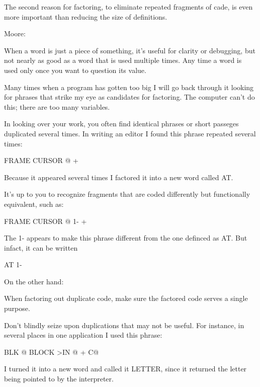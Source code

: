 \begin{tip}
The second reason for factoring, to eliminate repeated fragments of cade, is even more important than reducing the size of definitions.
\end{tip}

\begin{interview}
Moore:

\begin{tfquot}
When a word is just a piece of something, it's useful for clarity or debugging, but not nearly as good as a word that is used multiple times. Any time a word is used only once you want to question its value.

Many times when a program has gotten too big I will go back through it looking for phrases that strike my eye as candidates for factoring. The computer can't do this; there are too many variables.
\end{tfquot}
\end{interview}
In looking over your work, you often find identical phrases or short passeges duplicated several times. In writing an editor I found this phrase repeated several times:

\begin{Code}
FRAME  CURSOR @ +
\end{Code}
Because it appeared several times I factored it into a new word called AT.

It's up to you to recognize fragments that are coded differently but functionally equivalent, such as:

\begin{Code}
FRAME  CURSOR @ 1-  +
\end{Code}
The 1- appears to make this phrase different from the one definced as AT. But infact, it can be written

\begin{Code}
AT 1-
\end{Code}
On the other hand:

\begin{tip}
When factoring out duplicate code, make sure the factored code serves a single purpose.
\end{tip}
Don't blindly seize upon duplications that may not be useful. For instance, in several places in one application I used this phrase:

\begin{Code}
BLK @ BLOCK  >IN @ +  C@
\end{Code}
I turned it into a new word and called it LETTER, since it returned the letter being pointed to by the interpreter.

